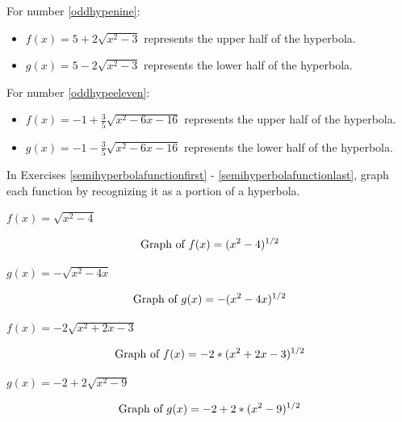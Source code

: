 \documentclass{ximera}
\begin{document}
\begin{problem}
\begin{solution}
\begin{itemize}
\end{itemize}

For number \ref{oddhypenine}:

\begin{itemize}

\item  $f(x) = 5+2 \sqrt{x^2-3}$ represents the upper half of the hyperbola.

\item  $g(x) = 5-2 \sqrt{x^2-3}$ represents the lower half of the hyperbola.

\end{itemize}

For number \ref{oddhypeeleven}:

\begin{itemize}

\item  $f(x) = -1+ \frac{3}{5} \sqrt{x^2-6x-16}$ represents the upper half of the hyperbola.

\item  $g(x) = -1- \frac{3}{5} \sqrt{x^2-6x-16} $ represents the lower half of the hyperbola.

\end{itemize}
\end{solution}
\end{problem}

\begin{question}
In Exercises \ref{semihyperbolafunctionfirst} - \ref{semihyperbolafunctionlast}, graph each function by recognizing it as a portion of a hyperbola.

\begin{problem}\label{semihyperbolafunctionfirst}
    $f(x) = \sqrt{x^2-4}$

\begin{solution}
$$\text{Graph of $f(x)=(x^2-4)^{1/2}$}$$
\end{solution}
\end{problem}

\begin{problem}
    $g(x) = -\sqrt{x^2-4x}$

\begin{solution}
$$\text{Graph of $g(x)=-(x^2-4x)^{1/2}$}$$
\end{solution}
\end{problem}

\begin{problem}
     $f(x) = -2\sqrt{x^2+2x-3}$

\begin{solution}
$$\text{Graph of $f(x)=-2*(x^2+2x-3)^{1/2}$}$$
\end{solution}
\end{problem}

\begin{problem}\label{semihyperbolafunctionlast}
    $g(x) = -2 + 2\sqrt{x^2-9}$

\begin{solution}
$$\text{Graph of $g(x)=-2 + 2*(x^2-9)^{1/2}$}$$
\end{solution}
\end{problem}
    
\end{question}
\end{document}
